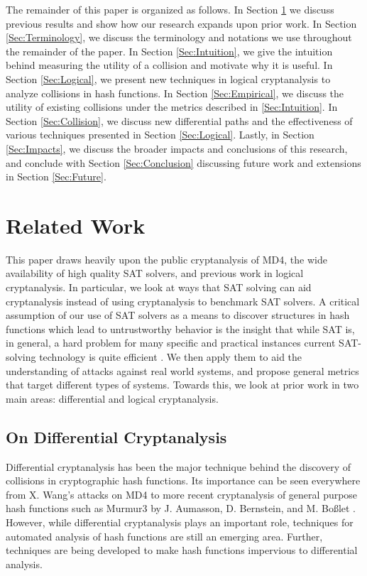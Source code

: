 \documentclass[conference]{IEEEtran}
\begin{document}
The remainder of this paper is organized as follows. In Section
\ref{Sec:Related} we discuss previous results and show how our research
expands upon prior work. In Section \ref{Sec:Terminology}, we discuss the
terminology and notations we use throughout the remainder of the paper.
In Section \ref{Sec:Intuition}, we give the intuition behind measuring
the utility of a collision and motivate why it is useful. In Section
\ref{Sec:Logical}, we present new techniques in logical cryptanalysis to
analyze collisions in hash functions. In Section \ref{Sec:Empirical}, we
discuss the utility of existing collisions under the metrics described in
\ref{Sec:Intuition}. In Section \ref{Sec:Collision}, we discuss new
differential paths and the effectiveness of various techniques presented
in Section \ref{Sec:Logical}. Lastly, in Section \ref{Sec:Impacts}, we
discuss the broader impacts and conclusions of this research, and
conclude with Section \ref{Sec:Conclusion} discussing future work and
extensions in Section \ref{Sec:Future}.

\section{Related Work} \label{Sec:Related}

This paper draws heavily upon the public cryptanalysis of MD4, the wide
availability of high quality SAT solvers, and previous work in logical
cryptanalysis. In particular, we look at ways that SAT solving can aid
cryptanalysis instead of using cryptanalysis to benchmark SAT
solvers.  A critical assumption of our use of SAT solvers as a means
to discover structures in hash functions which lead to untrustworthy
behavior is the insight that while SAT is, in general, a hard problem
for many specific and practical instances current SAT-solving
technology is quite efficient \cite{vardi2010p}. We
then apply them to aid the understanding of attacks against real world
systems, and propose general metrics that target different types of systems.
Towards this, we look at prior work in two main areas: differential and logical
cryptanalysis.

\subsection{On Differential Cryptanalysis}

Differential cryptanalysis has been the major technique behind the discovery
of collisions in cryptographic hash functions. Its importance can be seen
everywhere from X. Wang's attacks on MD4 \cite{Wang2005} to more recent
cryptanalysis of general purpose hash functions such as Murmur3 by
J. Aumasson, D. Bernstein, and M. Bo{\ss}let \cite{murmur3DC}. However, while
differential cryptanalysis plays an important role, techniques for automated
analysis of hash functions are still an emerging area. Further, techniques
are being developed to make hash functions impervious to differential
analysis.
\end{document}
